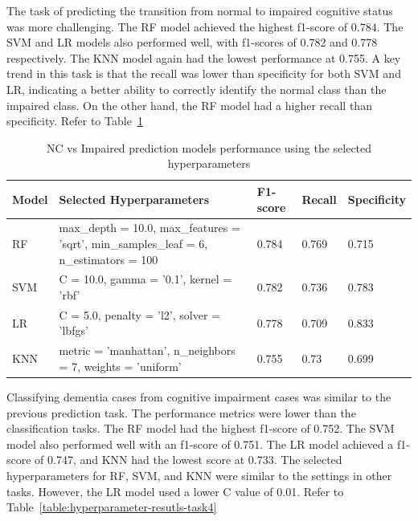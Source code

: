 The task of predicting the transition from normal to impaired cognitive status was more challenging. The RF model achieved the highest f1-score of 0.784. The SVM and LR models also performed well, with f1-scores of 0.782 and 0.778 respectively. The KNN model again had the lowest performance at 0.755. A key trend in this task is that the recall was lower than specificity for both SVM and LR, indicating a better ability to correctly identify the normal class than the impaired class. On the other hand, the RF model had a higher recall than specificity. Refer to Table~\ref{table:hyperparameter-resutls-task3}

\begin{table}[!ht]
    \centering
    \caption{NC vs Impaired prediction models performance using the selected hyperparameters}
    \begin{tabular}{|l|p{5cm}|l|l|l|}
    \hline
        Model & Selected Hyperparameters & F1-score & Recall & Specificity \\ \hline
        RF & max\_depth = 10.0, max\_features = 'sqrt', min\_samples\_leaf = 6, n\_estimators = 100 & 0.784 & 0.769 & 0.715 \\ \hline
        SVM & C = 10.0, gamma = '0.1', kernel = 'rbf' & 0.782 & 0.736 & 0.783 \\ \hline
        LR & C = 5.0, penalty = 'l2', solver = 'lbfgs' & 0.778 & 0.709 & 0.833 \\ \hline
        KNN & metric = 'manhattan', n\_neighbors = 7, weights = 'uniform' & 0.755 & 0.73 & 0.699 \\ \hline
    \end{tabular}
    \label{table:hyperparameter-resutls-task3}
\end{table}

Classifying dementia cases from cognitive impairment cases was similar to the previous prediction task. The performance metrics were lower than the classification tasks. The RF model had the highest f1-score of 0.752. The SVM model also performed well with an f1-score of 0.751. The LR model achieved a f1-score of 0.747, and KNN had the lowest score at 0.733. The selected hyperparameters for RF, SVM, and KNN were similar to the settings in other tasks. However, the LR model used a lower C value of 0.01. Refer to Table~\ref{table:hyperparameter-resutls-task4}

